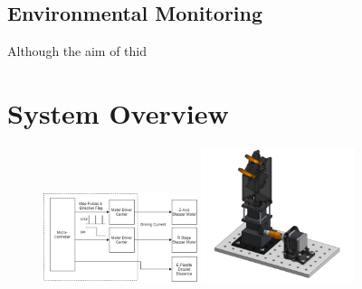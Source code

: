 \subsection{Environmental Monitoring}

Although the aim of thid


\section{System Overview}

\begin{figure}[h]
    \centering
    \includegraphics[width=0.4\textwidth]{img/ED_block_diag.png}
    \includegraphics[width=0.4\textwidth]{img/full_mech.png}
\end{figure}